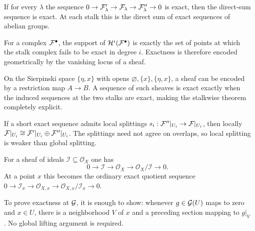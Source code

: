 \begin{example}
If for every $\lambda$ the sequence
$0\to\mathcal F'_{\lambda}\to\mathcal F_{\lambda}\to\mathcal F''_{\lambda}\to0$ is exact, then the direct-sum sequence is exact.  At each stalk this is the direct sum of exact sequences of abelian groups.
\end{example}

\begin{example}
For a complex $\mathcal F^{\bullet}$, the support of $\mathcal H^i(\mathcal F^{\bullet})$ is exactly the set of points at which the stalk complex fails to be exact in degree $i$.  Exactness is therefore encoded geometrically by the vanishing locus of a sheaf.
\end{example}

\begin{example}
On the Sierpinski space $\{\eta,x\}$ with opens $\varnothing,\{x\},\{\eta,x\}$, a sheaf can be encoded by a restriction map $A\to B$.  A sequence of such sheaves is exact exactly when the induced sequences at the two stalks are exact, making the stalkwise theorem completely explicit.
\end{example}

\begin{example}
If a short exact sequence admits local splittings $s_i:\mathcal F''|_{U_i}\to\mathcal F|_{U_i}$, then locally
$\mathcal F|_{U_i}\cong\mathcal F'|_{U_i}\oplus\mathcal F''|_{U_i}$.  The splittings need not agree on overlaps, so local splitting is weaker than global splitting.
\end{example}

\begin{example}
For a sheaf of ideals $\mathcal I\subseteq\mathcal O_X$ one has
\[
0\to\mathcal I\to\mathcal O_X\to\mathcal O_X/\mathcal I\to0.
\]
At a point $x$ this becomes the ordinary exact quotient sequence
$0\to\mathcal I_x\to\mathcal O_{X,x}\to\mathcal O_{X,x}/\mathcal I_x\to0$.
\end{example}

\begin{example}
To prove exactness at $\mathcal G$, it is enough to show: whenever $g\in\mathcal G(U)$ maps to zero and $x\in U$, there is a neighborhood $V$ of $x$ and a preceding section mapping to $g|_V$.  No global lifting argument is required.
\end{example}

